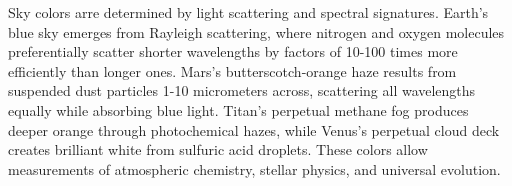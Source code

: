 Sky colors arre determined by light scattering and spectral signatures. Earth's blue sky emerges from Rayleigh scattering, where nitrogen and oxygen molecules preferentially scatter shorter wavelengths by factors of 10-100 times more efficiently than longer ones. Mars's butterscotch-orange haze results from suspended dust particles 1-10 micrometers across, scattering all wavelengths equally while absorbing blue light. Titan's perpetual methane fog produces deeper orange through photochemical hazes, while Venus's perpetual cloud deck creates brilliant white from sulfuric acid droplets. These colors allow measurements of atmospheric chemistry, stellar physics, and universal evolution.